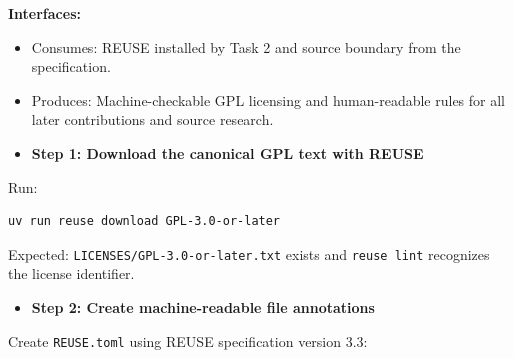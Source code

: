 \documentclass[
  letterpaper,
]{article}
\newcommand{\passthrough}[1]{#1}
\providecommand{\tightlist}{%
  \setlength{\itemsep}{0pt}\setlength{\parskip}{0pt}}
\begin{document}
\textbf{Interfaces:}

\begin{itemize}
\tightlist
\item
  Consumes: REUSE installed by Task 2 and source boundary from the specification.
\item
  Produces: Machine-checkable GPL licensing and human-readable rules for all later contributions and source research.
\end{itemize}

\begin{itemize}
\tightlist
\item[$\boxtimes$]
  \textbf{Step 1: Download the canonical GPL text with REUSE}
\end{itemize}

Run:

\begin{lstlisting}
uv run reuse download GPL-3.0-or-later
\end{lstlisting}

Expected: \nolinkurl{LICENSES/GPL-3.0-or-later.txt} exists and \passthrough{\lstinline!reuse lint!} recognizes the
license identifier.

\begin{itemize}
\tightlist
\item[$\boxtimes$]
  \textbf{Step 2: Create machine-readable file annotations}
\end{itemize}

Create \nolinkurl{REUSE.toml} using REUSE specification version 3.3:
\end{document}
